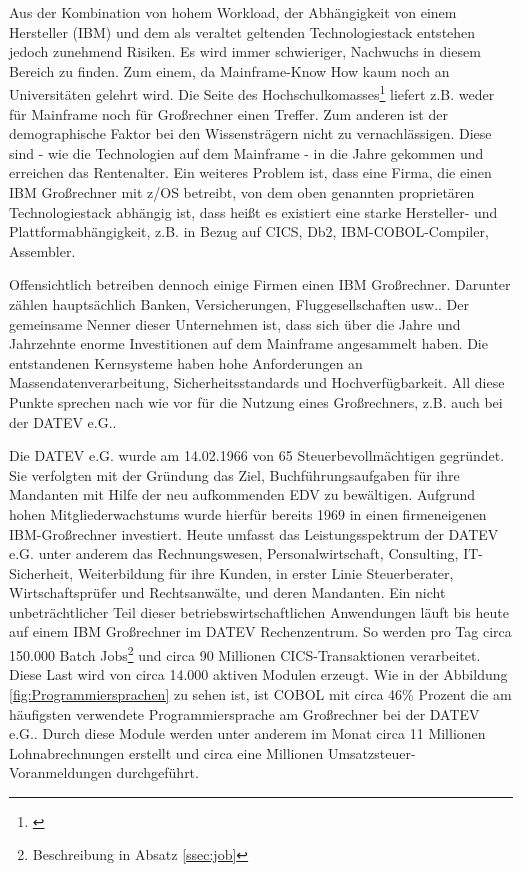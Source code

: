 Aus der Kombination von hohem Workload, der Abhängigkeit von einem Hersteller (IBM) und dem als veraltet geltenden Technologiestack entstehen jedoch zunehmend Risiken.
Es wird immer schwieriger, Nachwuchs in diesem Bereich zu finden.
Zum einem, da Mainframe-Know How kaum noch an Universitäten gelehrt wird.
Die Seite des Hochschulkomasses\footnote{\cite{internetagenturKolnFrankfurtsunzinetTYPO3Programmmierung.}} liefert z.B. weder für \glqq Mainframe\grqq{} noch für \glqq Großrechner\grqq{} einen Treffer.
Zum anderen ist der demographische Faktor bei den Wissensträgern nicht zu vernachlässigen. Diese sind - wie die Technologien auf dem Mainframe - in die Jahre gekommen und erreichen das Rentenalter.
Ein weiteres Problem ist, dass eine Firma, die einen IBM Großrechner mit z/OS betreibt, von dem oben genannten proprietären Technologiestack abhängig ist, dass heißt es existiert eine starke Hersteller- und Plattformabhängigkeit, z.B. in Bezug auf CICS, Db2, IBM-COBOL-Compiler, Assembler.

Offensichtlich betreiben dennoch einige Firmen einen IBM Großrechner.
Darunter zählen hauptsächlich Banken, Versicherungen, Fluggesellschaften usw..
Der gemeinsame Nenner dieser Unternehmen ist, dass sich über die Jahre und Jahrzehnte enorme Investitionen auf dem Mainframe angesammelt haben.
Die entstandenen Kernsysteme haben hohe Anforderungen an Massendatenverarbeitung, Sicherheitsstandards und Hochverfügbarkeit.
All diese Punkte sprechen nach wie vor für die Nutzung eines Großrechners, z.B. auch bei der DATEV e.G..
\cite{IBM.2014}

Die DATEV e.G. wurde am 14.02.1966 von 65 Steuerbevollmächtigen gegründet.
Sie verfolgten mit der Gründung das Ziel, Buchführungsaufgaben für ihre Mandanten mit Hilfe der neu aufkommenden EDV zu bewältigen.
Aufgrund hohen Mitgliederwachstums wurde hierfür bereits 1969 in einen firmeneigenen IBM-Großrechner investiert.\cite{DATEVeG.2017}
Heute umfasst das Leistungsspektrum der DATEV e.G. unter anderem das Rechnungswesen, Personalwirtschaft, Consulting, IT-Sicherheit, Weiterbildung für ihre Kunden, in erster Linie Steuerberater, Wirtschaftsprüfer und Rechtsanwälte, und deren Mandanten.
Ein nicht unbeträchtlicher Teil dieser betriebswirtschaftlichen Anwendungen läuft bis heute auf einem IBM Großrechner im DATEV Rechenzentrum.
So werden pro Tag circa 150.000 Batch Jobs\footnote{Beschreibung in Absatz \ref{ssec:job}} und circa 90 Millionen CICS-Transaktionen verarbeitet.
Diese Last wird von circa 14.000 aktiven Modulen erzeugt.
Wie in der Abbildung \ref{fig:Programmiersprachen} zu sehen ist, ist COBOL mit circa 46\% Prozent die am häufigsten verwendete Programmiersprache am Großrechner bei der DATEV e.G..
Durch diese Module werden unter anderem im Monat circa 11 Millionen Lohnabrechnungen erstellt und circa eine Millionen Umsatzsteuer-Voranmeldungen durchgeführt.

